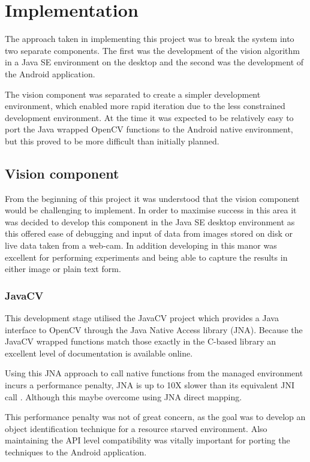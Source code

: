 \chapter{Implementation}
The approach taken in implementing this project was to break the system into two separate components. The first was the development of the vision algorithm in a Java SE environment on the desktop and the second was the development of the Android application.

The vision component was separated to create a simpler development environment, which enabled more rapid iteration due to the less constrained development environment. At the time it was expected to be relatively easy to port the Java wrapped OpenCV functions to the Android native environment, but this proved to be more difficult than initially planned. 

\section{Vision component}
From the beginning of this project it was understood that the vision component would be challenging to implement. In order to maximise success in this area it was decided to develop this component in the Java SE desktop environment as this offered ease of debugging and input of data from images stored on disk or live data taken from a web-cam. In addition developing in this manor was excellent for performing experiments and being able to capture the results in either image or plain text form.

\subsection{JavaCV}

This development stage utilised the JavaCV project which provides a Java interface to OpenCV through the Java Native Access library (JNA). Because the JavaCV wrapped functions match those exactly in the C-based library an excellent level of documentation is available online.

Using this JNA approach to call native functions from the managed environment incurs a performance penalty, JNA is up to 10X slower than its equivalent JNI call \cite{sun11}.  Although this maybe overcome using JNA direct mapping. 

This performance penalty was not of great concern, as the goal was to develop an object identification technique for a resource starved environment. Also maintaining the API level compatibility was vitally important for porting the techniques to the Android application.

